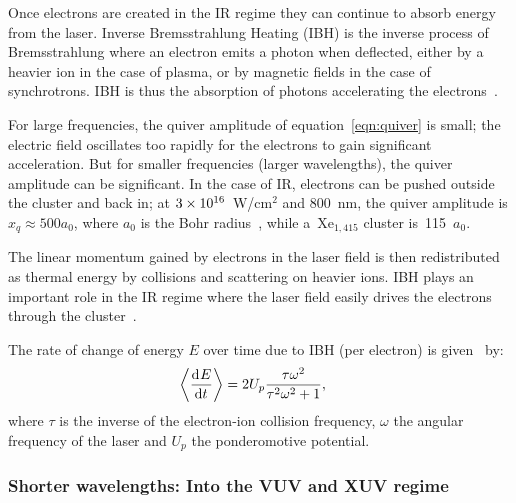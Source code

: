 
Once electrons are created in the IR regime they can continue to absorb energy
from the laser.
Inverse Bremsstrahlung Heating (IBH) is the inverse process of Bremsstrahlung
where an electron emits a photon when deflected, either by a heavier ion in the
case of plasma, or by magnetic fields in the case of synchrotrons. IBH is thus
the absorption of photons accelerating the electrons~\cite{Schlessinger1979}.

For large frequencies, the quiver amplitude of equation~\eqref{eqn:quiver} is
small; the electric field oscillates
too rapidly for the electrons to gain significant acceleration.
But for smaller frequencies (larger wavelengths), the quiver amplitude can
be significant. In the case of IR, electrons can be pushed outside the cluster
and back in; at $\ten{3}{16}$~W/cm$^2$ and 800~nm, the quiver
amplitude is $x_q \approx 500 a_0$, where $a_0$ is the Bohr
radius~\cite{Georgescu2007}, while a~Xe$_{1,415}$ cluster is~115~$a_0$.

The linear momentum gained by electrons in the laser field is then redistributed
as thermal energy by collisions and scattering on heavier ions.
IBH plays an important role in the IR regime where the laser field easily
drives the electrons through the cluster~\cite{Fennel2010}.

The rate of change of energy $E$ over time due to IBH (per electron) is
given~\cite{Fennel2010} by:
\begin{align}
\left< \frac{\textrm{d}^{{}} {E}}{\textrm{d} t^{{}}} \right> & = 2 U_p \frac{\tau \omega^2}{\tau^2 \omega^2 + 1},
\end{align}
where $\tau$ is the inverse of the electron-ion collision frequency, $\omega$ the
angular frequency of the laser and $U_p$ the ponderomotive potential.


\subsubsection{Shorter wavelengths: Into the VUV and XUV regime}
\label{section:intro:mechanisms:vuv}


